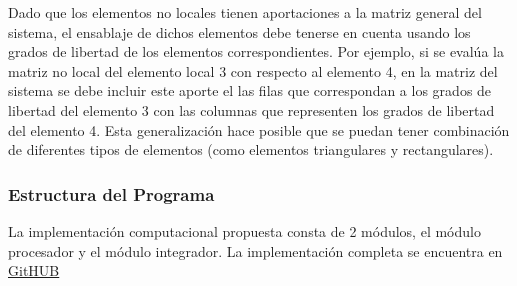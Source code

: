 \begin{enumerate}
				Dado que los elementos no locales tienen aportaciones a la matriz general del sistema, el ensablaje de dichos elementos debe tenerse en cuenta usando los grados de libertad de los elementos correspondientes. Por ejemplo, si se evalúa la matriz no local del elemento local 3 con respecto al elemento 4, en la matriz del sistema se debe incluir este aporte el las filas que correspondan a los grados de libertad del elemento 3 con las columnas que representen los grados de libertad del elemento 4. Esta generalización hace posible que se puedan tener combinación de diferentes tipos de elementos (como elementos triangulares y rectangulares).
			\end{enumerate}
		\subsubsection{Estructura del Programa}
		La implementación computacional propuesta consta de 2 módulos, el módulo procesador y el módulo integrador. La implementación completa se encuentra en \href{https://github.com/ZibraMax/NLFEM}{GitHUB} 
